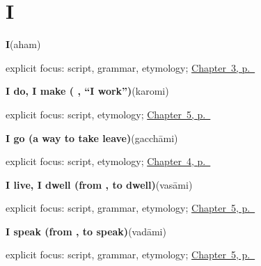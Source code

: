 \section*{I}

\noindent\begin{minipage}[t]{\linewidth}
\raggedright
\textbf{I}\enspace\emph{}\enspace(aham)\par
\footnotesize explicit focus: script, grammar, etymology; \hyperref[ch:responding]{Chapter~3, p.~\pageref*{ch:responding}}
\end{minipage}\par\smallskip

\noindent\begin{minipage}[t]{\linewidth}
\raggedright
\textbf{I do, I make ( , \textquotedblleft{}I work\textquotedblright{})}\enspace\emph{}\enspace(karomi)\par
\footnotesize explicit focus: script, etymology; \hyperref[ch:first-verbs]{Chapter~5, p.~\pageref*{ch:first-verbs}}
\end{minipage}\par\smallskip

\noindent\begin{minipage}[t]{\linewidth}
\raggedright
\textbf{I go (a way to take leave)}\enspace\emph{}\enspace(gacchāmi)\par
\footnotesize explicit focus: script, etymology; \hyperref[ch:farewells]{Chapter~4, p.~\pageref*{ch:farewells}}
\end{minipage}\par\smallskip

\noindent\begin{minipage}[t]{\linewidth}
\raggedright
\textbf{I live, I dwell (from , to dwell)}\enspace\emph{}\enspace(vasāmi)\par
\footnotesize explicit focus: script, grammar, etymology; \hyperref[ch:first-verbs]{Chapter~5, p.~\pageref*{ch:first-verbs}}
\end{minipage}\par\smallskip

\noindent\begin{minipage}[t]{\linewidth}
\raggedright
\textbf{I speak (from , to speak)}\enspace\emph{}\enspace(vadāmi)\par
\footnotesize explicit focus: script, grammar, etymology; \hyperref[ch:first-verbs]{Chapter~5, p.~\pageref*{ch:first-verbs}}
\end{minipage}\par\smallskip

